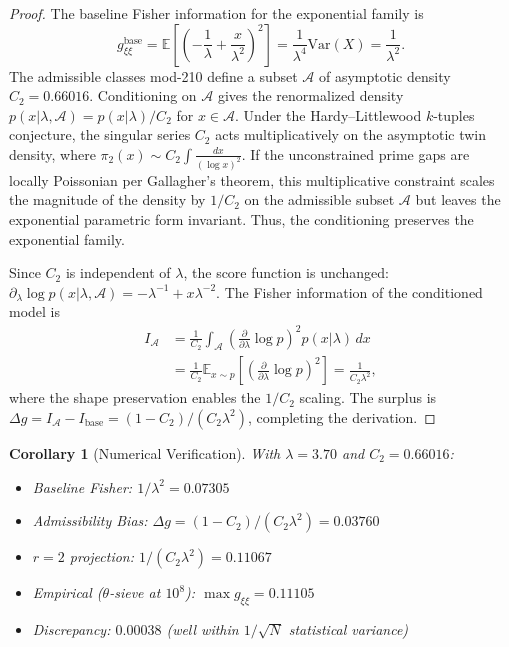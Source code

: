 \documentclass[12pt]{article}
\newtheorem{corollary}[theorem]{Corollary}
\begin{document}
\begin{proof}
The baseline Fisher information for the exponential family is
\[
  g_{\xi\xi}^{\text{base}} = \mathbb{E}\!\left[\left(-\frac{1}{\lambda} + \frac{x}{\lambda^2}\right)^2\right]
  = \frac{1}{\lambda^4}\text{Var}(X) = \frac{1}{\lambda^2}.
\]
The admissible classes mod-210 define a subset $\mathcal{A}$ of asymptotic density
$C_2 = 0.66016$. Conditioning on $\mathcal{A}$ gives the renormalized density
$p(x|\lambda,\mathcal{A}) = p(x|\lambda)/C_2$ for $x \in \mathcal{A}$. Under the Hardy--Littlewood $k$-tuples conjecture, the singular series $C_2$
acts multiplicatively on the asymptotic twin density, where $\pi_2(x) \sim C_2 \int
\frac{dx}{(\log x)^2}$. If the unconstrained prime gaps are locally Poissonian
per Gallagher's theorem, this multiplicative constraint scales the magnitude of
the density by $1/C_2$ on the admissible subset $\mathcal{A}$ but leaves the
exponential parametric form invariant. Thus, the conditioning preserves the
exponential family.

Since $C_2$ is independent of $\lambda$, the score function is unchanged:
$\partial_\lambda \log p(x|\lambda,\mathcal{A}) = -\lambda^{-1} + x\lambda^{-2}$.
The Fisher information of the conditioned model is
\begin{align*}
  I_{\mathcal{A}} &= \frac{1}{C_2} \int_{\mathcal{A}}
    \left(\frac{\partial}{\partial\lambda}\log p\right)^2 p(x|\lambda)\,dx \\
  &= \frac{1}{C_2} \mathbb{E}_{x \sim p}\!\left[\left(\frac{\partial}{\partial\lambda}
    \log p\right)^2\right] = \frac{1}{C_2\lambda^2},
\end{align*}
where the shape preservation enables the $1/C_2$ scaling. The surplus is
$\Delta g = I_{\mathcal{A}} - I_{\text{base}} = (1-C_2)/(C_2\lambda^2)$,
completing the derivation.
\end{proof}

\begin{corollary}[Numerical Verification]
With $\lambda = 3.70$ and $C_2 = 0.66016$:
\begin{itemize}
  \item Baseline Fisher: $1/\lambda^2 = 0.07305$
  \item Admissibility Bias: $\Delta g = (1-C_2)/(C_2\lambda^2) = 0.03760$
  \item $r=2$ projection: $1/(C_2\lambda^2) = 0.11067$
  \item Empirical ($\theta$-sieve at $10^8$): $\max g_{\xi\xi} = 0.11105$
  \item Discrepancy: $0.00038$ (well within $1/\sqrt{N}$ statistical variance)
\end{itemize}
\end{corollary}
\end{document}
